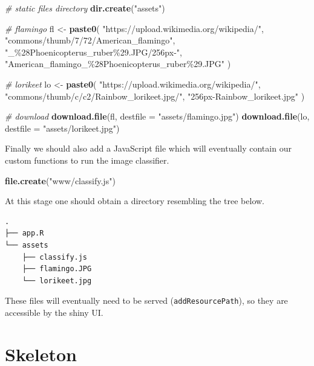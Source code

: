 \documentclass[
]{krantz}
\makeatletter
\newenvironment{Shaded}{\begin{snugshade}}{\end{snugshade}}
\newcommand{\CommentTok}[1]{\textcolor[rgb]{0.37,0.37,0.37}{\textit{#1}}}
\newcommand{\DataTypeTok}[1]{\textcolor[rgb]{0.27,0.27,0.27}{#1}}
\newcommand{\KeywordTok}[1]{\textcolor[rgb]{0.27,0.27,0.27}{\textbf{#1}}}
\newcommand{\NormalTok}[1]{#1}
\newcommand{\StringTok}[1]{\textcolor[rgb]{0.5,0.5,0.5}{#1}}
\newenvironment{kframe}{%
\medskip{}
\setlength{\fboxsep}{.8em}
 \def\at@end@of@kframe{}%
 \ifinner\ifhmode%
  \def\at@end@of@kframe{\end{minipage}}%
  \begin{minipage}{\columnwidth}%
 \fi\fi%
 \def\FrameCommand##1{\hskip\@totalleftmargin \hskip-\fboxsep
 \colorbox{shadecolor}{##1}\hskip-\fboxsep
     \hskip-\linewidth \hskip-\@totalleftmargin \hskip\columnwidth}%
 \MakeFramed {\advance\hsize-\width
   \@totalleftmargin\z@ \linewidth\hsize
   \@setminipage}}%
 {\par\unskip\endMakeFramed%
 \at@end@of@kframe}
\renewenvironment{Shaded}{\begin{kframe}}{\end{kframe}}
\makeatother
\begin{document}
\begin{Shaded}
\begin{Highlighting}[]
\CommentTok{\# static files directory}
\KeywordTok{dir.create}\NormalTok{(}\StringTok{"assets"}\NormalTok{)}

\CommentTok{\# flamingo}
\NormalTok{fl <{-}}\StringTok{ }\KeywordTok{paste0}\NormalTok{(}
  \StringTok{"https://upload.wikimedia.org/wikipedia/"}\NormalTok{,}
  \StringTok{"commons/thumb/7/72/American\_flamingo"}\NormalTok{,}
  \StringTok{"\_\%28Phoenicopterus\_ruber\%29.JPG/256px{-}"}\NormalTok{,}
  \StringTok{"American\_flamingo\_\%28Phoenicopterus\_ruber\%29.JPG"}
\NormalTok{)}

\CommentTok{\# lorikeet}
\NormalTok{lo <{-}}\StringTok{ }\KeywordTok{paste0}\NormalTok{(}
  \StringTok{"https://upload.wikimedia.org/wikipedia/"}\NormalTok{,}
  \StringTok{"commons/thumb/c/c2/Rainbow\_lorikeet.jpg/"}\NormalTok{,}
  \StringTok{"256px{-}Rainbow\_lorikeet.jpg"}
\NormalTok{)}

\CommentTok{\# download}
\KeywordTok{download.file}\NormalTok{(fl, }\DataTypeTok{destfile =} \StringTok{"assets/flamingo.jpg"}\NormalTok{)}
\KeywordTok{download.file}\NormalTok{(lo, }\DataTypeTok{destfile =} \StringTok{"assets/lorikeet.jpg"}\NormalTok{)}
\end{Highlighting}
\end{Shaded}

Finally we should also add a JavaScript file which will eventually contain our custom functions to run the image classifier.

\begin{Shaded}
\begin{Highlighting}[]
\KeywordTok{file.create}\NormalTok{(}\StringTok{"www/classify.js"}\NormalTok{)}
\end{Highlighting}
\end{Shaded}

At this stage one should obtain a directory resembling the tree below.

\begin{verbatim}
.
├── app.R
└── assets
    ├── classify.js
    ├── flamingo.JPG
    └── lorikeet.jpg
\end{verbatim}

These files will eventually need to be served (\texttt{addResourcePath}), so they are accessible by the shiny UI.

\hypertarget{shiny-complete-skeleton}{%
\section{Skeleton}\label{shiny-complete-skeleton}}
\end{document}
